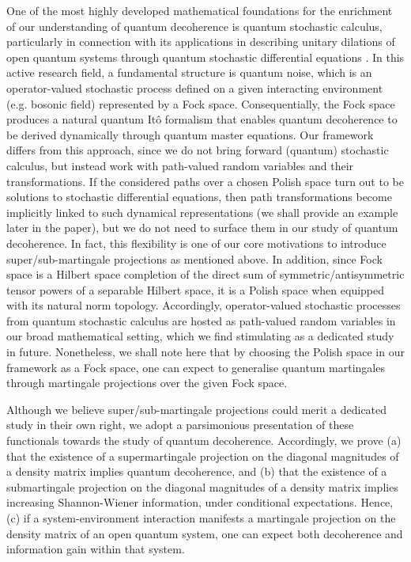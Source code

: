 \documentclass[12pt,a4paper]{article}
\begin{document}
One of the most highly developed mathematical foundations for the enrichment of  our understanding of quantum decoherence is quantum stochastic calculus, particularly in connection with its applications in describing unitary dilations of open quantum systems through quantum stochastic differential equations \cite{Hudson Parthasarathy 1982, Hudson Parthasarathy 1984, Parthasarathy Sinha 1986, Parthasarathy 1992, Meyer 1993, Fagnola 1994, Fagnola Wills 2003, Chang 2015}. In this active research field, a fundamental structure is quantum noise, which is an operator-valued stochastic process defined on a given interacting environment (e.g. bosonic field) represented by a Fock space. Consequentially, the Fock space produces a natural quantum It\^o formalism that enables quantum decoherence to be derived dynamically through quantum master equations. Our framework differs from this approach, since we do not bring forward (quantum) stochastic calculus, but instead work with path-valued random variables and their transformations. If the considered paths over a chosen Polish space turn out to be solutions to stochastic differential equations, then path transformations become implicitly linked to such dynamical representations (we shall provide an example later in the paper), but we do not need to surface them in our study of quantum decoherence. In fact, this flexibility is one of our core motivations to introduce super/sub-martingale projections as mentioned above. In addition, since Fock space is a Hilbert space completion of the direct sum of symmetric/antisymmetric tensor powers of a separable Hilbert space, it is a Polish space when equipped with its natural norm topology. Accordingly, operator-valued stochastic processes from quantum stochastic calculus are hosted as path-valued random variables in our broad mathematical setting, which we find stimulating as a dedicated study in future. Nonetheless, we shall note here that by choosing the Polish space in our framework as a Fock space, one can expect to generalise quantum martingales through martingale projections over the given Fock space.

Although we believe super/sub-martingale projections could merit a dedicated study in their own right, we adopt a parsimonious presentation of these functionals towards the study of quantum decoherence. Accordingly, we prove (a) that the existence of a supermartingale projection on the diagonal magnitudes of a density matrix implies quantum decoherence, and (b) that the existence of a submartingale projection on the diagonal magnitudes of a density matrix implies increasing Shannon-Wiener information, under conditional expectations. Hence, (c) if a system-environment interaction manifests a martingale projection on the density matrix of an open quantum system, one can expect both decoherence and information gain within that system. 
\end{document}
